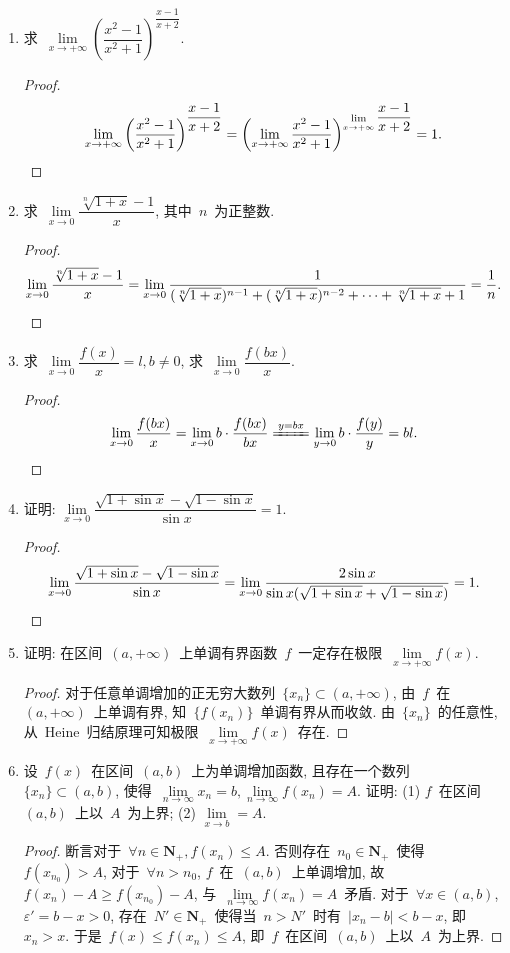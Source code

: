 \documentclass[UTF8,a4paper,11pt,twoside]{book}
\begin{document}
\begin{enumerate}
	\item 求~$\lim\limits_{x\to+\infty} \left(\dfrac{x^2-1}{x^2+1}\right)^{\dfrac{x-1}{x+2}}$.
	      \begin{proof}
		      \[
			      \lim\limits_{x\to+\infty} \left(\dfrac{x^2-1}{x^2+1}\right)^{\dfrac{x-1}{x+2}}=\left(\lim\limits_{x\to+\infty} \dfrac{x^2-1}{x^2+1}\right)^{\lim\limits_{x\to+\infty} \dfrac{x-1}{x+2}}=1. \qedhere
		      \]
	      \end{proof}

	\item 求~$\lim\limits_{x\to 0} \dfrac{\sqrt[n]{1+x}-1}{x}$, 其中~$n$~为正整数.
	      \begin{proof}
		      \[
			      \lim\limits_{x\to 0} \dfrac{\sqrt[n]{1+x}-1}{x}=\lim\limits_{x\to 0}\dfrac{1}{(\sqrt[n]{1+x})^{n-1}+(\sqrt[n]{1+x})^{n-2}+\cdots+\sqrt[n]{1+x}+1}=\dfrac{1}{n}. \qedhere
		      \]
	      \end{proof}

	\item 求~$\lim\limits_{x\to 0} \dfrac{f(x)}{x}=l, b\neq 0$, 求~$\lim\limits_{x\to 0} \dfrac{f(bx)}{x}$.
	      \begin{proof}
		      \[
			      \lim\limits_{x\to 0} \dfrac{f(bx)}{x}=\lim\limits_{x\to 0} b\cdot\dfrac{f(bx)}{bx}\xlongequal{y=bx}\lim\limits_{y\to 0} b\cdot\dfrac{f(y)}{y}=bl. \qedhere
		      \]
	      \end{proof}

	\item 证明: $\lim\limits_{x\to 0} \dfrac{\sqrt{1+\sin{x}}-\sqrt{1-\sin{x}}}{\sin{x}}=1$.
	      \begin{proof}
		      \[
			      \lim\limits_{x\to 0} \dfrac{\sqrt{1+\sin{x}}-\sqrt{1-\sin{x}}}{\sin{x}}=\lim\limits_{x\to 0} \dfrac{2\sin{x}}{\sin{x}(\sqrt{1+\sin{x}}+\sqrt{1-\sin{x}})}=1. \qedhere
		      \]
	      \end{proof}

	\item 证明: 在区间~$(a,+\infty)$~上单调有界函数~$f$~一定存在极限~$\lim\limits_{x\to+\infty} f(x)$.
	      \begin{proof}
		      对于任意单调增加的正无穷大数列~$\{x_n\}\subset(a,+\infty)$, 由~$f$~在~$(a,+\infty)$~上单调有界, 知~$\{f(x_n)\}$~单调有界从而收敛. 由~$\{x_n\}$~的任意性, 从~Heine~归结原理可知极限~$\lim\limits_{x\to+\infty} f(x)$~存在. \qedhere
	      \end{proof}

	\item 设~$f(x)$~在区间~$(a,b)$~上为单调增加函数, 且存在一个数列~$\{x_n\}\subset(a,b)$, 使得~$\lim\limits_{n\to\infty} x_n=b, \lim\limits_{n\to\infty} f(x_n)=A$. 证明: (1) $f$~在区间~$(a,b)$~上以~$A$~为上界; (2) $\lim\limits_{x\to b}=A$.
	      \begin{proof}
		      断言对于~$\forall n\in\mathbf{N}_{+}, f(x_n)\leqslant A$. 否则存在~$n_0\in\mathbf{N}_{+}$~使得~$f(x_{n_0})>A$, 对于~$\forall n>n_0$, $f$~在~$(a,b)$~上单调增加, 故~$f(x_n)-A\geqslant f(x_{n_0})-A$, 与~$\lim\limits_{n\to\infty} f(x_n)=A$~矛盾. 对于~$\forall x\in(a,b)$, $\varepsilon'=b-x>0$, 存在~$N'\in\mathbf{N}_{+}$~使得当~$n>N'$~时有~$|x_n-b|<b-x$, 即~$x_n>x$. 于是~$f(x)\leqslant f(x_n)\leqslant A$, 即~$f$~在区间~$(a,b)$~上以~$A$~为上界.


\end{proof}
\end{enumerate}
\end{document}
